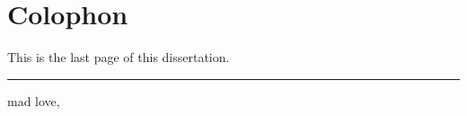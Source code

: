 %
\pagestyle{empty}
\hfill
\vfill
{}
\section*{Colophon}

{\Large This is the last page of this dissertation. }


\bigskip

\begin{flushright}
        \begin{minipage}{5cm}
                \rule{\textwidth}{1pt}
        		mad love, \\
                \thesisName
        \end{minipage}
\end{flushright}
